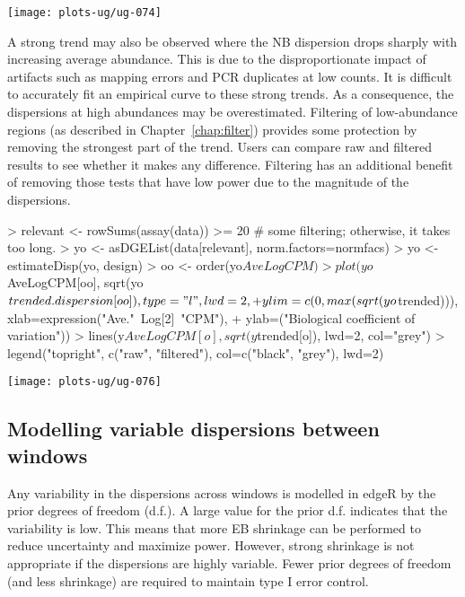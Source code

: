 \documentclass[12pt]{report}
\renewenvironment{Schunk}{\vspace{0pt}}{\vspace{0pt}}
\newcommand{\edger}{edgeR}
\begin{document}
\begin{center}
\texttt{[image: plots-ug/ug-074]}
\end{center}

A strong trend may also be observed where the NB dispersion drops sharply with increasing average abundance.
This is due to the disproportionate impact of artifacts such as mapping errors and PCR duplicates at low counts. 
It is difficult to accurately fit an empirical curve to these strong trends.  
As a consequence, the dispersions at high abundances may be overestimated. 
Filtering of low-abundance regions (as described in Chapter~\ref{chap:filter}) provides some protection by removing the strongest part of the trend.
Users can compare raw and filtered results to see whether it makes any difference.
Filtering has an additional benefit of removing those tests that have low power due to the magnitude of the dispersions.

\begin{Schunk}
\begin{Sinput}
> relevant <- rowSums(assay(data)) >= 20 # some filtering; otherwise, it takes too long.
> yo <- asDGEList(data[relevant], norm.factors=normfacs)
> yo <- estimateDisp(yo, design)
> oo <- order(yo$AveLogCPM)
> plot(yo$AveLogCPM[oo], sqrt(yo$trended.dispersion[oo]), type="l", lwd=2,
+   ylim=c(0, max(sqrt(yo$trended))), xlab=expression("Ave."~Log[2]~"CPM"), 
+   ylab=("Biological coefficient of variation"))
> lines(y$AveLogCPM[o], sqrt(y$trended[o]), lwd=2, col="grey")
> legend("topright", c("raw", "filtered"), col=c("black", "grey"), lwd=2)
\end{Sinput}
\end{Schunk}

\begin{center}
\texttt{[image: plots-ug/ug-076]}
\end{center}

\subsection{Modelling variable dispersions between windows}
Any variability in the dispersions across windows is modelled in \edger{} by the prior degrees of freedom (d.f.).
A large value for the prior d.f. indicates that the variability is low. 
This means that more EB shrinkage can be performed to reduce uncertainty and maximize power. 
However, strong shrinkage is not appropriate if the dispersions are highly variable. 
Fewer prior degrees of freedom (and less shrinkage) are required to maintain type I error control. 
\end{document}
